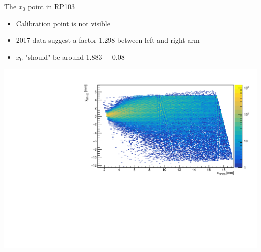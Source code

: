 \documentclass{beamer}
\begin{document}
\begin{frame}\scriptsize
	\begin{block}{The $x_{0}$ point in RP103}
    		\begin{itemize}
			\item Calibration point is not visible
			\item 2017 data suggest a factor 1.298 between left and right arm
			\item $x_{0}$ "should" be around 1.883 $\pm$ 0.08
		\end{itemize}
             \includegraphics[width=1.0\textwidth]{Run_314276/neck_rp_103_m.pdf}
	\end{block}
	
\end{frame}
\end{document}
